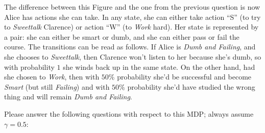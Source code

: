 \documentclass[fleqn]{hw}
\begin{document}
The difference between this Figure and the one from the previous
question is now Alice has actions she can take.  In any state, she can
either take action ``S'' (to try to \emph{Sweettalk} Clarence) or action
``W'' (to \emph{Work} hard).  Her state is represented by a pair: she can
either be smart or dumb, and she can either pass or fail the course.
The transitions can be read as follows.  If Alice is \emph{Dumb and Failing},
and she chooses to \emph{Sweettalk}, then Clarence won't listen to her
because she's dumb, so with probability $1$ she winds back up in the
same state.  On the other hand, had she chosen to \emph{Work}, then with
$50\%$ probability she'd be successful and become \emph{Smart} (but still
\emph{Failing}) and with $50\%$ probability she'd have studied the wrong
thing and will remain \emph{Dumb and Failing}.

Please answer the following questions with respect to this MDP; always
assume $\gamma = 0.5$:
\end{document}

